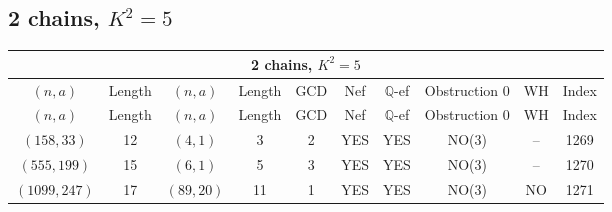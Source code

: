 \subsection{2 chains, $K^2 = 5$}
\begin{longtable}{|c|c|c|c|c|c|c|c|c|c|}
\hline
\multicolumn{10}{|c|}{2 chains, $K^2 = 5$}\\
\hline
$(n,a)$ & Length & $(n,a)$ & Length & GCD & Nef & $\mathbb Q$-ef & Obstruction 0 & WH & Index\\
\hline
\endfirsthead

\hline
$(n,a)$ & Length & $(n,a)$ & Length & GCD & Nef & $\mathbb Q$-ef & Obstruction 0 & WH & Index\\
\hline
\endhead
\hline
\endfoot

$(158, 33)$ & 12 & $(4, 1)$ & 3 & 2 & YES & YES & NO(3) & -- & 1269\\
$(555, 199)$ & 15 & $(6, 1)$ & 5 & 3 & YES & YES & NO(3) & -- & 1270\\
$(1099, 247)$ & 17 & $(89, 20)$ & 11 & 1 & YES & YES & NO(3) & NO & 1271
\end{longtable}
